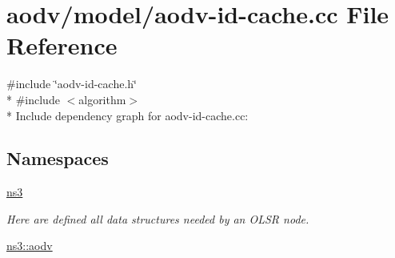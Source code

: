 \hypertarget{aodv-id-cache_8cc}{}\section{aodv/model/aodv-\/id-\/cache.cc File Reference}
\label{aodv-id-cache_8cc}
{\ttfamily \#include \char`\"{}aodv-\/id-\/cache.\+h\char`\"{}}\\*
{\ttfamily \#include $<$algorithm$>$}\\*
Include dependency graph for aodv-\/id-\/cache.cc\+:
\subsection*{Namespaces}
\begin{DoxyCompactItemize}
\item 
 \hyperlink{namespacens3}{ns3}
\begin{DoxyCompactList}\small\item\em Here are defined all data structures needed by an O\+L\+SR node. \end{DoxyCompactList}\item 
 \hyperlink{namespacens3_1_1aodv}{ns3\+::aodv}
\end{DoxyCompactItemize}
